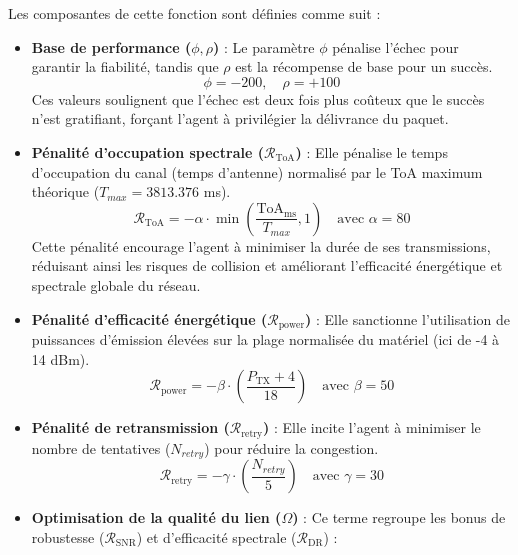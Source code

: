 Les composantes de cette fonction sont définies comme suit :

\begin{itemize}
	\item \textbf{Base de performance ($\phi, \rho$)} : 
	Le paramètre $\phi$ pénalise l'échec pour garantir la fiabilité, tandis que $\rho$ est la récompense de base pour un succès.
	\[ \phi = -200, \quad \rho = +100 \]
	Ces valeurs soulignent que l'échec est deux fois plus coûteux que le succès n'est gratifiant, forçant l'agent à privilégier la délivrance du paquet.
	
	\item \textbf{Pénalité d'occupation spectrale ($\mathcal{R}_{\text{ToA}}$)} :
	Elle pénalise le temps d'occupation du canal (temps d'antenne) normalisé par le ToA maximum théorique ($T_{max} = 3813.376$ ms).
	\begin{equation}
		\mathcal{R}_{\text{ToA}} = -\alpha \cdot \min\left(\frac{\text{ToA}_{\text{ms}}}{T_{max}}, 1\right) \quad \text{avec } \alpha = 80
	\end{equation}
	Cette pénalité encourage l'agent à minimiser la durée de ses transmissions, réduisant ainsi les risques de collision et améliorant l'efficacité énergétique et spectrale globale du réseau.
	
	\item \textbf{Pénalité d'efficacité énergétique ($\mathcal{R}_{\text{power}}$)} : 
	Elle sanctionne l'utilisation de puissances d'émission élevées sur la plage normalisée du matériel (ici de -4 à 14 dBm).
	\begin{equation}
		\mathcal{R}_{\text{power}} = -\beta \cdot \left( \frac{P_{\text{TX}} + 4}{18} \right) \quad \text{avec } \beta = 50
	\end{equation}
	
	\item \textbf{Pénalité de retransmission ($\mathcal{R}_{\text{retry}}$)} : 
	Elle incite l'agent à minimiser le nombre de tentatives ($N_{retry}$) pour réduire la congestion.
	\begin{equation}
		\mathcal{R}_{\text{retry}} = -\gamma \cdot (\frac{N_{retry}}{5}) \quad \text{avec } \gamma = 30
	\end{equation}
	
	\item \textbf{Optimisation de la qualité du lien ($\Omega$)} : 
	Ce terme regroupe les bonus de robustesse ($\mathcal{R}_{\text{SNR}}$) et d'efficacité spectrale ($\mathcal{R}_{\text{DR}}$) :
	

\end{itemize}
